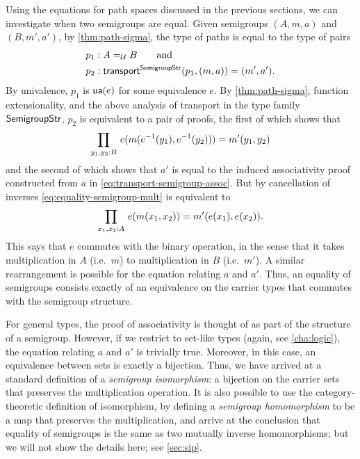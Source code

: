 Using the equations for path spaces discussed in the previous sections,
we can investigate when two semigroups are equal. Given semigroups
$(A,m,a)$ and $(B,m',a')$, by \cref{thm:path-sigma}, the type of paths
is equal to the type of pairs
\begin{align*}
p_1 &: A =_{\mathcal{U}} B \qquad\text{and}\\
p_2 &: \mathsf{transport}^{\mathsf{SemigroupStr}}(p_1,(m,a)) = {(m',a')}.
\end{align*}
By univalence, $p_1$ is $\mathsf{ua}(e)$ for some equivalence $e$. By
\cref{thm:path-sigma}, function extensionality, and the above analysis of
transport in the type family $\mathsf{SemigroupStr}$, $p_2$ is equivalent to a pair
of proofs, the first of which shows that
\begin{equation} \label{eq:equality-semigroup-mult}
\prd{y_1,y_2:B} e(m(\opp{e}(y_1), \opp{e}(y_2))) = m'(y_1,y_2)
\end{equation}
and the second of which shows that $a'$ is equal to the induced
associativity proof constructed from $a$ in
\eqref{eq:transport-semigroup-assoc}.  But by cancellation of inverses
\eqref{eq:equality-semigroup-mult} is equivalent to
\[
\prd{x_1,x_2:A} e(m(x_1, x_2)) = m'(e(x_1),e(x_2)).
\]
This says that $e$ commutes with the binary operation, in the sense
that it takes multiplication in $A$ (i.e.\ $m$) to multiplication in $B$
(i.e.\ $m'$).  A similar rearrangement is possible for the equation relating
$a$ and $a'$.  Thus, an equality of semigroups consists exactly of an
equivalence on the carrier types that commutes with the semigroup
structure.

For general types, the proof of associativity is thought of as part of
the structure of a semigroup.  However, if we restrict to set-like types
(again, see \cref{cha:logic}), the
equation relating $a$ and $a'$ is trivially true.  Moreover, in this
case, an equivalence between sets is exactly a bijection.  Thus, we have
arrived at a standard definition of a \emph{semigroup isomorphism}: a
bijection on the carrier sets that preserves the multiplication
operation.  It is also possible to use the category-theoretic definition
of isomorphism, by defining a \emph{semigroup homomorphism} to be a map
that preserves the multiplication, and arrive at the conclusion that equality of
semigroups is the same as two mutually inverse homomorphisms; but we
will not show the details here; see \cref{sec:sip}.

